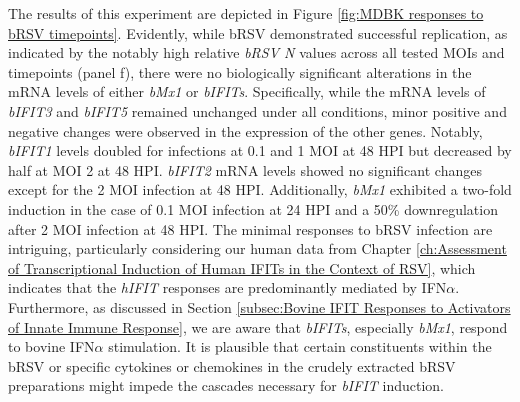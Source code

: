 The results of this experiment are depicted in Figure \ref{fig:MDBK responses to bRSV timepoints}. Evidently, while bRSV demonstrated successful replication, as indicated by the notably high relative \textit{bRSV N} values across all tested MOIs and timepoints (panel f), there were no biologically significant alterations in the mRNA levels of either \textit{bMx1} or \textit{bIFITs}. Specifically, while the mRNA levels of \textit{bIFIT3} and \textit{bIFIT5} remained unchanged under all conditions, minor positive and negative changes were observed in the expression of the other genes. Notably, \textit{bIFIT1} levels doubled for infections at 0.1 and 1 MOI at 48 HPI but decreased by half at MOI 2 at 48 HPI. \textit{bIFIT2} mRNA levels showed no significant changes except for the 2 MOI infection at 48 HPI. Additionally, \textit{bMx1} exhibited a two-fold induction in the case of 0.1 MOI infection at 24 HPI and a 50\% downregulation after 2 MOI infection at 48 HPI. The minimal responses to bRSV infection are intriguing, particularly considering our human data from Chapter \ref{ch:Assessment of Transcriptional Induction of Human IFITs in the Context of RSV}, which indicates that the \textit{hIFIT} responses are predominantly mediated by IFN\(\alpha\). Furthermore, as discussed in Section \ref{subsec:Bovine IFIT Responses to Activators of Innate Immune Response}, we are aware that \textit{bIFITs}, especially \textit{bMx1}, respond to bovine IFN\(\alpha\) stimulation. It is plausible that certain constituents within the bRSV or specific cytokines or chemokines in the crudely extracted bRSV preparations might impede the cascades necessary for \textit{bIFIT} induction.

